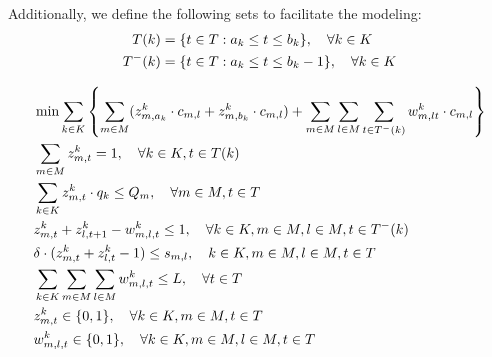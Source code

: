 \documentclass[a4paper,twoside,11pt]{article}
\begin{document}
Additionally, we define the following sets to facilitate the modeling:
\begin{align*}
T(k) &= \{t \in T : a_k \leq t \leq b_k\}, \quad \forall k \in K \\
T^{-}(k) &= \{t \in T : a_k \leq t \leq b_k - 1\}, \quad \forall k \in K
\end{align*}

        

\begin{align}
&\min \sum_{k \in K} \left\{ \sum_{m \in M}(z^k_{m,a_k}\cdot c_{m,l} + z^k_{m,b_k}\cdot c_{m,l}) + \sum_{m \in M}\sum_{l \in M}\sum_{t \in T^{-}(k)} w^k_{m,lt}\cdot c_{m,l}\right\}\\
&\sum_{m\in M}z^k_{m,t}=1,\quad \forall k \in K,t \in T(k)\\
&\sum_{k \in K}z^k_{m,t}\cdot q_k \leq Q_m,\quad \forall m \in M,t\in T\\
&z^k_{m,t} + z^k_{l,t+1} - w^k_{m,l,t} \leq 1 ,\quad \forall k\in K,m \in M,l\in M,t\in T^{-}(k)\\
&\delta\cdot(z^k_{m,t}+z^k_{l,t}-1) \leq s_{m,l},\quad k\in K,m \in M,l\in M,t\in T \\
&\sum_{k \in K} \sum_{m \in M} \sum_{l \in M} w^k_{m,l,t} \leq L,\quad \forall t \in T  \\
&z^k_{m,t} \in \{0,1\}, \quad \forall k \in K, m \in M, t \in T \\
&w^k_{m,l,t} \in \{0,1\}, \quad \forall k \in K, m \in M, l \in M, t \in T
\end{align}
\end{document}

